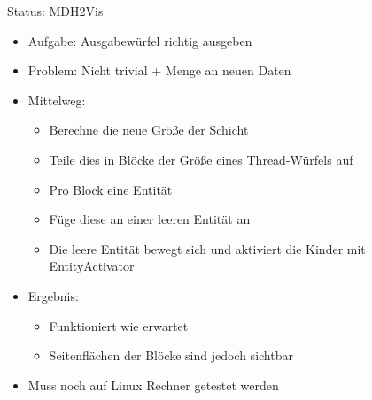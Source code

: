 \documentclass{../presentation}
\begin{document}
\begin{frame}{Status: MDH2Vis}
    \begin{itemize}
        \item Aufgabe: Ausgabewürfel richtig ausgeben
        \item Problem: Nicht trivial + Menge an neuen Daten
        \item Mittelweg:
        \begin{itemize}
            \item Berechne die neue Größe der Schicht
            \item Teile dies in Blöcke der Größe eines Thread-Würfels auf
            \item Pro Block eine Entität
            \item Füge diese an einer leeren Entität an
            \item Die leere Entität bewegt sich und aktiviert die Kinder mit EntityActivator
        \end{itemize}
        \item Ergebnis:
        \begin{itemize}
            \item Funktioniert wie erwartet
            \item Seitenflächen der Blöcke sind jedoch sichtbar
        \end{itemize}
        \item Muss noch auf Linux Rechner getestet werden
    \end{itemize}
\end{frame}
\end{document}
